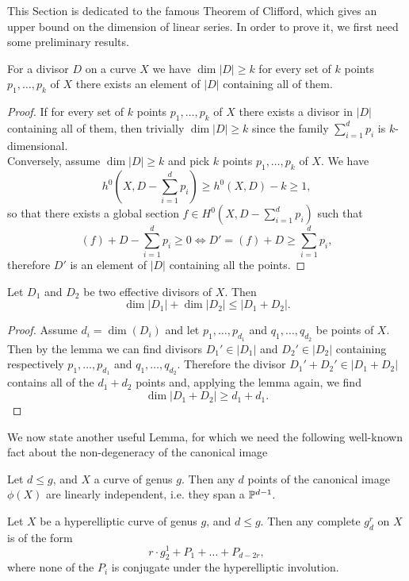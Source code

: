 	This Section is dedicated to the famous Theorem of Clifford, which gives an upper bound on the dimension of linear series. In order to prove it, we first need some preliminary results.
		\begin{lemm}
		For a divisor $D$ on a curve $X$ we have $\dim|D|\geq k$ \ABiff for every set of $k$ points $p_1, \dots, p_k$ of $X$ there exists an element of $|D|$ containing all of them.
	\end{lemm}
	\begin{proof}
		If for every set of $k$ points $p_1, \dots, p_k$ of $X$ there exists a divisor in $|D|$ containing all of them, then trivially $\dim|D|\geq k$ since the family $\sum_{i=1}^d p_i$ is $k$-dimensional.\\
		Conversely, assume $\dim|D|\geq k$ and pick $k$ points $p_1, \dots, p_k$ of $X$. We have 
		$$ h^0(X, D - \sum_{i=1}^d p_i) \geq h^0(X, D) - k \geq 1, $$
		so that there exists a global section $f\in H^0(X, D - \sum_{i=1}^d p_i)$ such that 
		$$ (f)+D-\sum_{i=1}^d p_i \geq 0 \iff D' = (f)+D \geq \sum_{i=1}^d p_i, $$
		therefore $D'$ is an element of $|D|$ containing all the points.
	\end{proof}
	\begin{coro}
		Let $D_1$ and $D_2$ be two effective divisors of $X$. Then
		$$ \dim|D_1| + \dim|D_2| \leq |D_1+D_2|. $$
	\end{coro}
	\begin{proof}
		Assume $d_i=\dim(D_i)$ and let $p_1,\dots,p_{d_1}$ and $q_1,\dots,q_{d_2}$ be points of $X$. Then by the lemma we can find divisors $D_1'\in |D_1|$ and $D_2'\in |D_2|$ containing respectively $p_1,\dots,p_{d_1}$ and $q_1,\dots,q_{d_2}$. Therefore the divisor $D_1'+D_2' \in |D_1+D_2|$ contains all of the $d_1+d_2$ points and, applying the lemma again, we find
		$$ \dim|D_1 + D_2| \geq d_1 + d_1. $$
	\end{proof}
	We now state another useful Lemma, for which we need the following well-known fact about the non-degeneracy of the canonical image
	\begin{prop}
		Let $d\leq g$, and $X$ a curve of genus $g$. Then any $d$ points of the canonical image $\phi(X)$ are linearly independent, i.e. they span a $\mathbb{P}^{d-1}.$
	\end{prop}
	\begin{lemm}\label{lemm:hyp_linear}
		Let $X$ be a hyperelliptic curve of genus $g$, and $d\leq g$. Then any complete $g_d^r$ on $X$ is of the form
		$$ r\cdot g_2^1 + P_1 + \dots + P_{d-2r}, $$
		where none of the $P_i$ is conjugate under the hyperelliptic involution.
	\end{lemm}
